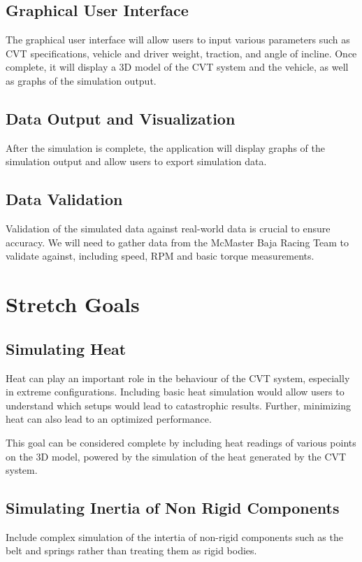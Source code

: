 \documentclass{article}
\begin{document}
\subsection{Graphical User Interface}
The graphical user interface will allow users to input various parameters such as CVT specifications, 
vehicle and driver weight, traction, and angle of incline. Once complete, it will display a 3D model
of the CVT system and the vehicle, as well as graphs of the simulation output.

\subsection{Data Output and Visualization}
After the simulation is complete, the application will display graphs of the simulation output 
and allow users to export simulation data.

\subsection{Data Validation}
Validation of the simulated data against real-world data is crucial to ensure accuracy. 
We will need to gather data from the McMaster Baja Racing Team to validate against, including 
speed, RPM and basic torque measurements.

\section{Stretch Goals}
\subsection{Simulating Heat}
Heat can play an important role in the behaviour of the CVT system, especially in extreme 
configurations. Including basic heat simulation would allow users to understand which
setups would lead to catastrophic results. Further, minimizing heat can also lead to an optimized
performance.

This goal can be considered complete by including heat readings of various points on the 3D 
model, powered by the simulation of the heat generated by the CVT system.

\subsection{Simulating Inertia of Non Rigid Components}
Include complex simulation of the intertia of non-rigid components such as the belt and 
springs rather than treating them as rigid bodies.
\end{document}
